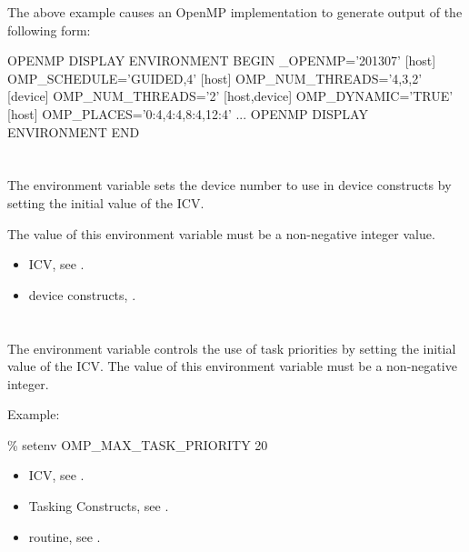 The above example causes an OpenMP implementation to generate output of the 
following form:

\begin{boxedcode}
OPENMP DISPLAY ENVIRONMENT BEGIN
  \_OPENMP='201307'
  [host] OMP\_SCHEDULE='GUIDED,4'
  [host] OMP\_NUM\_THREADS='4,3,2'
  [device] OMP\_NUM\_THREADS='2'
  [host,device] OMP\_DYNAMIC='TRUE'
  [host] OMP\_PLACES='{0:4},{4:4},{8:4},{12:4}'
  ...
OPENMP DISPLAY ENVIRONMENT END
\end{boxedcode}








\section{}
\label{sec:OMP_DEFAULT_DEVICE}
The  environment variable sets the device number to use in 
device constructs by setting the initial value of the  ICV.

The value of this environment variable must be a non-negative integer value.

\crossreferences
\begin{itemize}
\item {} ICV, see .

\item device constructs, .
\end{itemize}


\section{}
\label{sec:OMP_MAX_TASK_PRIORITY}

The  environment variable controls the use of task
priorities by setting the initial value of the  ICV. The
value of this environment variable must be a non-negative integer. 

Example:
\begin{boxedcode}
\% setenv OMP\_MAX\_TASK\_PRIORITY 20
\end{boxedcode}

\crossreferences
\begin{itemize}
\item {} ICV, see .
\item Tasking Constructs, see .
\item {} routine, see .
\end{itemize}


